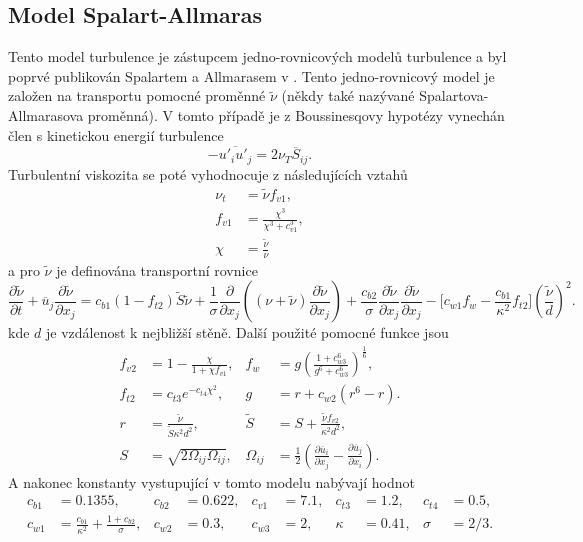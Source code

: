 \subsection{Model Spalart-Allmaras}
Tento model turbulence je zástupcem jedno-rovnicových modelů turbulence a byl poprvé publikován Spalartem a Allmarasem v \cite{spalart1992one}. Tento jedno-rovnicový model je založen na transportu pomocné proměnné $\widetilde{\nu}$ (někdy také nazývané Spalartova-Allmarasova proměnná). V tomto případě je z Boussinesqovy hypotézy vynechán člen s kinetickou energií turbulence
\begin{equation}
-\overline{u'_i u'_j} = 2\nu_T \overline{S}_{ij}.
\end{equation}
Turbulentní viskozita se poté vyhodnocuje z následujících vztahů
\begin{align}
\nu_t &= \widetilde{\nu}f_{v1},\\
f_{v1} &= \frac{\chi^3}{\chi^3 + c^3_{v1}},\\
\chi &= \frac{\widetilde{\nu}}{\nu}
\end{align}
a pro $\widetilde{\nu}$ je definována transportní rovnice
\begin{equation}
\frac{\partial \widetilde{\nu}}{\partial t} + \overline{u}_j\frac{\partial \widetilde{\nu}}{\partial x_j} = c_{b1}(1-f_{t2})\widetilde{S}\widetilde{\nu} + \frac{1}{\sigma}\frac{\partial}{\partial x_j}\left((\nu + \widetilde{\nu})\frac{\partial \widetilde{\nu}}{\partial x_j} \right) + \frac{c_{b2}}{\sigma}\frac{\partial \widetilde{\nu}}{\partial x_j}\frac{\partial \widetilde{\nu}}{\partial x_j} - \bigg[c_{w1}f_{w}-\frac{c_{b1}}{\kappa^2}f_{t2}\bigg]\left( \frac{\widetilde{\nu}}{d} \right)^2.
\end{equation}
kde $ d $ je vzdálenost k nejbližší stěně. Další použité pomocné funkce jsou
\begin{align*}
f_{v2} &= 1 - \frac{\chi}{1+\chi f_{v1}},   &f_{w} &= g \left( \frac{1+c_{w3}^6}{g^6 + c_{w3}^6} \right)^{\frac{1}{6}}, \\
f_{t2} &= c_{t3}e^{-c_{t4}\chi^2},   &g &= r + c_{w2}(r^6 - r).\\
r &= \frac{\widetilde{\nu}}{\widetilde{S}\kappa^2d^2},  &\widetilde{S} &= S + \frac{\widetilde{\nu}f_{v2}}{\kappa^2 d^2}, \\ 
S &= \sqrt{2\Omega_{ij}\Omega_{ij}}, &\Omega_{ij} &= \frac{1}{2}\left( \frac{\partial \overline{u}_i}{\partial x_j} - \frac{\partial \overline{u}_j}{\partial x_i} \right).
\end{align*}
A nakonec konstanty vystupující v tomto modelu nabývají hodnot 
\begin{align*}
c_{b1} &= 0.1355,  &c_{b2} &= 0.622,  &c_{v1} &= 7.1,  &c_{t3} &= 1.2, &c_{t4} &= 0.5,\\
c_{w1} &= \frac{c_{b1}}{\kappa^2} + \frac{1+c_{b2}}{\sigma},  &c_{w2} &= 0.3,  &c_{w3} &= 2,  &\kappa &= 0.41,  &\sigma &= 2/3.
\end{align*}


